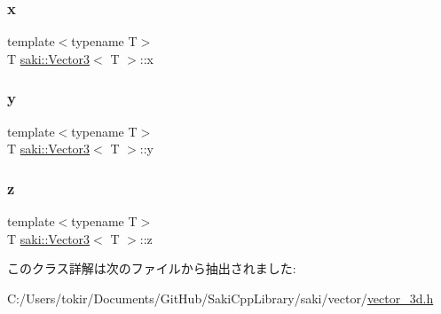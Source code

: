 \subsubsection{\texorpdfstring{x}{x}}
{\footnotesize\ttfamily template$<$typename T$>$ \\
T \mbox{\hyperlink{classsaki_1_1_vector3}{saki\+::\+Vector3}}$<$ T $>$\+::x}

\mbox{\label{classsaki_1_1_vector3_aba41be4543769bd023387691acf654dd}} 
\subsubsection{\texorpdfstring{y}{y}}
{\footnotesize\ttfamily template$<$typename T$>$ \\
T \mbox{\hyperlink{classsaki_1_1_vector3}{saki\+::\+Vector3}}$<$ T $>$\+::y}

\mbox{\label{classsaki_1_1_vector3_abb4ddf92f66d05e965fbd17ab3e655ff}} 
\subsubsection{\texorpdfstring{z}{z}}
{\footnotesize\ttfamily template$<$typename T$>$ \\
T \mbox{\hyperlink{classsaki_1_1_vector3}{saki\+::\+Vector3}}$<$ T $>$\+::z}



このクラス詳解は次のファイルから抽出されました\+:\begin{DoxyCompactItemize}
\item 
C\+:/\+Users/tokir/\+Documents/\+Git\+Hub/\+Saki\+Cpp\+Library/saki/vector/\mbox{\hyperlink{vector__3d_8h}{vector\+\_\+3d.\+h}}\end{DoxyCompactItemize}
